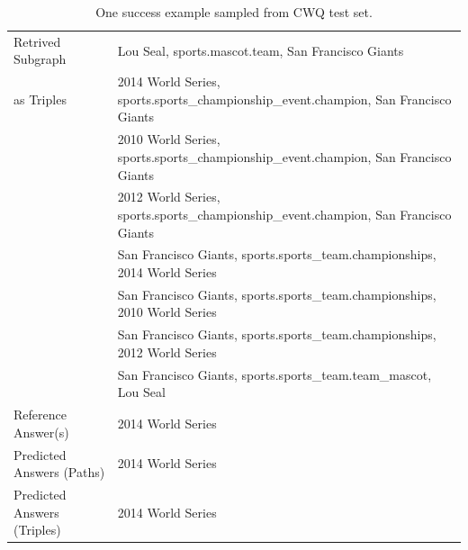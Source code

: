 \begin{table}[h]
\begin{tabular}{lp{11cm}}
        \midrule
        Retrived Subgraph & Lou Seal, sports.mascot.team, San Francisco Giants \\
        as Triples & 2014 World Series, sports.sports\_championship\_event.champion, San Francisco Giants \\
        & 2010 World Series, sports.sports\_championship\_event.champion, San Francisco Giants \\
        & 2012 World Series, sports.sports\_championship\_event.champion, San Francisco Giants \\
        & San Francisco Giants, sports.sports\_team.championships, 2014 World Series \\
        & San Francisco Giants, sports.sports\_team.championships, 2010 World Series \\
        & San Francisco Giants, sports.sports\_team.championships, 2012 World Series \\
        & San Francisco Giants, sports.sports\_team.team\_mascot, Lou Seal\\

        \midrule
        Reference Answer(s) & 2014 World Series \\
        \midrule
        Predicted Answers (Paths) & 2014 World Series \\
        Predicted Answers (Triples) & 2014 World Series \\
    \bottomrule
    \end{tabular}
    \caption{One success example sampled from CWQ test set.}
    \label{tab:case_success}
\end{table}


